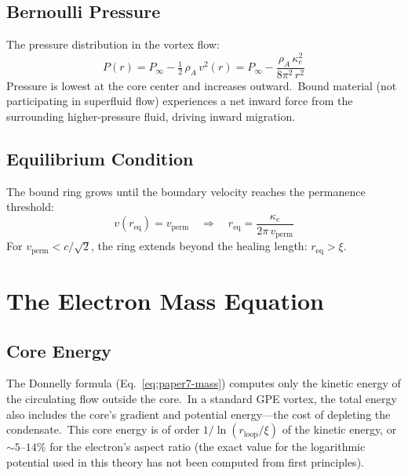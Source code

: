 \documentclass[12pt,letterpaper]{article}
\newcommand{\rhoa}{\rho_{\!A}}
\newcommand{\rloop}{r_{\mathrm{loop}}}
\begin{document}
\subsection{Bernoulli Pressure}
\label{sec:bernoulli-pressure}

The pressure distribution in the vortex flow:
%
\begin{equation}
  P(r) = P_\infty - \tfrac{1}{2}\,\rhoa\,v^2(r)
       = P_\infty - \frac{\rhoa\,\kappa_e^2}{8\pi^2\,r^2}
  \label{eq:bernoulli}
\end{equation}
%
Pressure is lowest at the core center and increases outward.\ Bound material
(not participating in superfluid flow) experiences a net inward force from
the surrounding higher-pressure fluid, driving inward migration.

\subsection{Equilibrium Condition}
\label{sec:equilibrium}

The bound ring grows until the boundary velocity reaches the permanence
threshold:
%
\begin{equation}
  v(r_{\mathrm{eq}}) = v_{\mathrm{perm}}
  \quad\Longrightarrow\quad
  r_{\mathrm{eq}} = \frac{\kappa_e}{2\pi\,v_{\mathrm{perm}}}
  \label{eq:req}
\end{equation}
%
For $v_{\mathrm{perm}} < c/\sqrt{2}$, the ring extends beyond the healing
length: $r_{\mathrm{eq}} > \xi$.



\section{The Electron Mass Equation}
\label{sec:mass-equation}

\subsection{Core Energy}
\label{sec:core-energy}

The Donnelly formula \cite{donnelly1991} (Eq.~\ref{eq:paper7-mass}) computes
only the kinetic energy of the circulating flow outside the core.\ In a standard GPE vortex,
the total energy also includes the core's gradient and potential energy---the
cost of depleting the condensate.\ This core energy is of order
$1/\ln(\rloop/\xi)$ of the kinetic energy, or $\sim\!5$--$14\%$ for the
electron's aspect ratio (the exact value for the logarithmic potential used
in this theory has not been computed from first principles).
\end{document}
